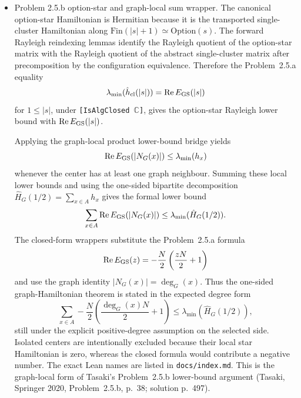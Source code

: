 \documentclass[a4paper,11pt]{article}
\begin{document}
\begin{itemize}
        graph-local star.  The exact Lean names are listed in
        \texttt{docs/index.md}.
  \item Problem 2.5.b option-star and graph-local sum wrapper.  The canonical
        option-star Hamiltonian is Hermitian because it is the transported
        single-cluster Hamiltonian along
        \(\mathrm{Fin}(|s|+1)\simeq\mathrm{Option}(s)\).  The forward
        Rayleigh reindexing lemmas identify the Rayleigh quotient of the
        option-star matrix with the Rayleigh quotient of the abstract
        single-cluster matrix after precomposition by the configuration
        equivalence.  Therefore the Problem~2.5.a equality
        \[
          \lambda_{\min}(\hat h_{\rm cl}(|s|))
          =
          \operatorname{Re}E_{\rm GS}(|s|)
        \]
        for \(1\le |s|\), under \texttt{[IsAlgClosed \(\mathbb C\)]}, gives
        the option-star Rayleigh lower bound with
        \(\operatorname{Re}E_{\rm GS}(|s|)\).

        Applying the graph-local product lower-bound bridge yields
        \[
          \operatorname{Re}E_{\rm GS}(|N_G(x)|)
          \le
          \lambda_{\min}(h_x)
        \]
        whenever the center has at least one graph neighbour.  Summing these
        local lower bounds and using the one-sided bipartite decomposition
        \(\hat H_G(1/2)=\sum_{x\in A}h_x\) gives the formal lower bound
        \[
          \sum_{x\in A}\operatorname{Re}E_{\rm GS}(|N_G(x)|)
          \le
          \lambda_{\min}(\hat H_G(1/2)).
        \]
        The closed-form wrappers substitute the Problem~2.5.a formula
        \[
          \operatorname{Re}E_{\rm GS}(z)
          =
          -\frac{N}{2}\left(\frac{zN}{2}+1\right)
        \]
        and use the graph identity \(|N_G(x)|=\deg_G(x)\).  Thus the
        one-sided graph-Hamiltonian theorem is stated in the expected
        degree form
        \[
          \sum_{x\in A}
          -\frac{N}{2}\left(\frac{\deg_G(x)N}{2}+1\right)
          \le
          \lambda_{\min}(\hat H_G(1/2)),
        \]
        still under the explicit positive-degree assumption on the selected
        side.  Isolated centers are intentionally excluded because their
        local star Hamiltonian is zero, whereas the closed formula would
        contribute a negative number.
        The exact Lean names are listed in \texttt{docs/index.md}.  This is
        the graph-local form of Tasaki's Problem~2.5.b lower-bound argument
        (Tasaki, Springer 2020, Problem~2.5.b, p.~38; solution p.~497).
\end{itemize}
\end{document}
